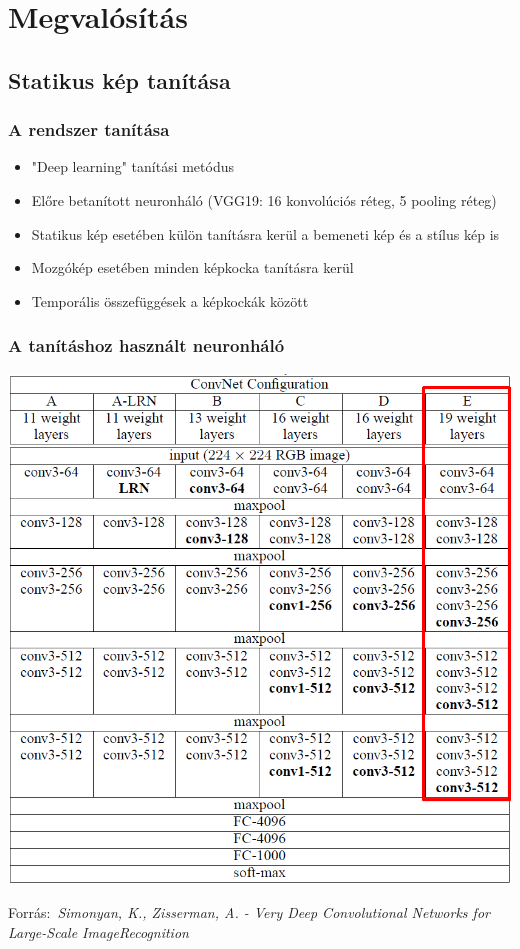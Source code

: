 \documentclass{beamer}
\newcommand{\credit}[1]{\par\hfill \footnotesize \tiny Forrás:~\itshape#1}
\begin{document}
	\section{Megvalósítás}
	\subsection{Statikus kép tanítása}
	
	\begin{frame}
		\frametitle{A rendszer tanítása}
		\begin{itemize}
			\item "Deep learning" tanítási metódus
			\item Előre betanított neuronháló (VGG19: 16 konvolúciós réteg, 5 pooling réteg)
			\item Statikus kép esetében külön tanításra kerül a bemeneti kép és a stílus kép is
			\item Mozgókép esetében minden képkocka tanításra kerül
			\item Temporális összefüggések a képkockák között
		\end{itemize}
	\end{frame}
	
	\begin{frame}
		\frametitle{A tanításhoz használt neuronháló}
		\begin{center}
			\includegraphics[scale=0.2]{VGG19.png}
			\credit{Simonyan, K., Zisserman, A. - Very Deep Convolutional Networks for Large-Scale ImageRecognition}
		\end{center}
	\end{frame}
\end{document}
